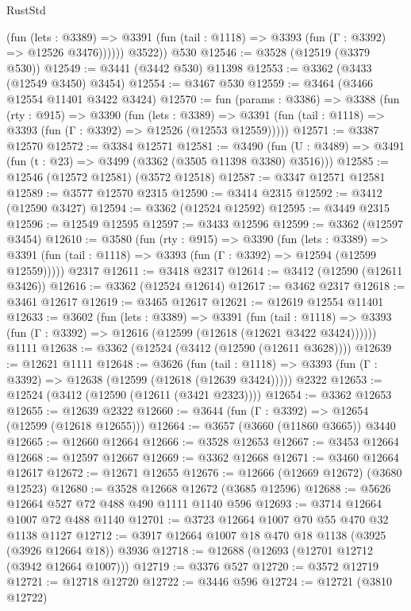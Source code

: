 \begin{lexlean}{RustStd}
\begin{coremodule}
              (fun (lets : @3389) =>
              @3391 (fun (tail : @1118) => @3393 (fun (Γ : @3392) => @12526 @3476))))))
        @3522))
    @530
@12546 := @3528 (@12519 (@3379 @530))
@12549 := @3441 (@3442 @530) @11398
@12553 := @3362 (@3433 (@12549 @3450) @3454)
@12554 := @3467 @530
@12559 := @3464 (@3466 @12554 @11401 @3422 @3424)
@12570 := fun (params : @3386) =>
  @3388
    (fun (rty : @915) =>
    @3390
      (fun (lets : @3389) =>
      @3391 (fun (tail : @1118) => @3393 (fun (Γ : @3392) => @12526 (@12553 @12559)))))
@12571 := @3387 @12570
@12572 := @3384 @12571
@12581 := @3490
    (fun (U : @3489) => @3491 (fun (t : @23) => @3499 (@3362 (@3505 @11398 @3380) @3516)))
@12585 := @12546 (@12572 @12581) (@3572 @12518)
@12587 := @3347 @12571 @12581
@12589 := @3577 @12570 @2315
@12590 := @3414 @2315
@12592 := @3412 (@12590 @3427)
@12594 := @3362 (@12524 @12592)
@12595 := @3449 @2315
@12596 := @12549 @12595
@12597 := @3433 @12596
@12599 := @3362 (@12597 @3454)
@12610 := @3580
    (fun (rty : @915) =>
    @3390
      (fun (lets : @3389) =>
      @3391 (fun (tail : @1118) => @3393 (fun (Γ : @3392) => @12594 (@12599 @12559)))))
    @2317
@12611 := @3418 @2317
@12614 := @3412 (@12590 (@12611 @3426))
@12616 := @3362 (@12524 @12614)
@12617 := @3462 @2317
@12618 := @3461 @12617
@12619 := @3465 @12617
@12621 := @12619 @12554 @11401
@12633 := @3602
    (fun (lets : @3389) =>
    @3391
      (fun (tail : @1118) =>
      @3393 (fun (Γ : @3392) => @12616 (@12599 (@12618 (@12621 @3422 @3424))))))
    @1111
@12638 := @3362 (@12524 (@3412 (@12590 (@12611 @3628))))
@12639 := @12621 @1111
@12648 := @3626
    (fun (tail : @1118) => @3393 (fun (Γ : @3392) => @12638 (@12599 (@12618 (@12639 @3424)))))
    @2322
@12653 := @12524 (@3412 (@12590 (@12611 (@3421 @2323))))
@12654 := @3362 @12653
@12655 := @12639 @2322
@12660 := @3644 (fun (Γ : @3392) => @12654 (@12599 (@12618 @12655)))
@12664 := @3657 (@3660 (@11860 @3665)) @3440
@12665 := @12660 @12664
@12666 := @3528 @12653
@12667 := @3453 @12664
@12668 := @12597 @12667
@12669 := @3362 @12668
@12671 := @3460 @12664 @12617
@12672 := @12671 @12655
@12676 := @12666 (@12669 @12672) (@3680 @12523)
@12680 := @3528 @12668 @12672 (@3685 @12596)
@12688 := @5626 @12664 @527 @72 @488 @490 @1111 @1140 @596
@12693 := @3714 @12664 @1007 @72 @488 @1140
@12701 := @3723 @12664 @1007 @70 @55 @470 @32 @1138 @1127
@12712 := @3917 @12664 @1007 @18 @470 @18 @1138 (@3925 (@3926 @12664 @18)) @3936
@12718 := @12688 (@12693 (@12701 @12712 (@3942 @12664 @1007)))
@12719 := @3376 @527
@12720 := @3572 @12719
@12721 := @12718 @12720
@12722 := @3446 @596
@12724 := @12721 (@3810 @12722)

\end{coremodule}
\end{lexlean}
